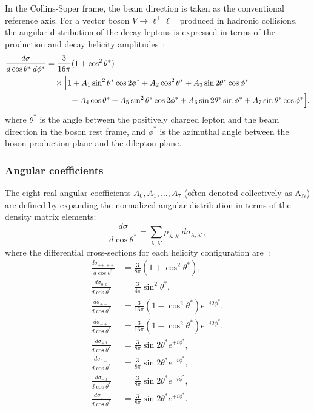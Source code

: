 \documentclass[11pt]{article}
\begin{document}
In the Collins-Soper frame, the beam direction is taken as the conventional reference axis. For a vector boson $V \to \ell^+\ell^-$ produced in hadronic collisions, the angular distribution of the decay leptons is expressed in terms of the production and decay helicity amplitudes~\cite{CMS:2015cyj,ATLAS:2016rnf,Mirkes:1994eb}:
\begin{align}
    \frac{d\sigma}{d\cos\theta^* \, d\phi^*}
    &= \frac{3}{16\pi} (1 + \cos^2\theta^*) \notag \\
    &\quad \times \Bigl[1
        + A_1 \sin^2\theta^* \cos 2\phi^*
        + A_2 \cos^2\theta^*
        + A_3 \sin 2\theta^* \cos\phi^* \notag \\
    &\qquad\quad + A_4 \cos\theta^*
        + A_5 \sin^2\theta^* \cos 2\phi^*
        + A_6 \sin 2\theta^* \sin\phi^*
        + A_7 \sin\theta^* \cos\phi^*\Bigr],
\end{align}
where $\theta^*$ is the angle between the positively charged lepton and the beam direction in the boson rest frame, and $\phi^*$ is the azimuthal angle between the boson production plane and the dilepton plane.

\subsubsection{Angular coefficients}

The eight real angular coefficients $A_0, A_1, \ldots, A_7$ (often denoted collectively as A$_N$) are defined by expanding the normalized angular distribution in terms of the density matrix elements:
\begin{equation}
    \frac{d\sigma}{d\cos\theta^*} = \sum_{\lambda,\lambda'} \rho_{\lambda,\lambda'} \, d\sigma_{\lambda,\lambda'},
\end{equation}
where the differential cross-sections for each helicity configuration are~\cite{Mirkes:1994eb}:
\begin{align}
    \frac{d\sigma_{++,++}}{d\cos\theta^*} &= \frac{3}{8\pi} (1 + \cos^2\theta^*), \\
    \frac{d\sigma_{0,0}}{d\cos\theta^*} &= \frac{3}{4\pi} \sin^2\theta^*, \\
    \frac{d\sigma_{+-}}{d\cos\theta^*} &= \frac{3}{16\pi} (1 - \cos^2\theta^*) e^{+i2\phi^*}, \\
    \frac{d\sigma_{-+}}{d\cos\theta^*} &= \frac{3}{16\pi} (1 - \cos^2\theta^*) e^{-i2\phi^*}, \\
    \frac{d\sigma_{+0}}{d\cos\theta^*} &= \frac{3}{8\pi} \sin 2\theta^* e^{+i\phi^*}, \\
    \frac{d\sigma_{0+}}{d\cos\theta^*} &= \frac{3}{8\pi} \sin 2\theta^* e^{-i\phi^*}, \\
    \frac{d\sigma_{-0}}{d\cos\theta^*} &= \frac{3}{8\pi} \sin 2\theta^* e^{-i\phi^*}, \\
    \frac{d\sigma_{0-}}{d\cos\theta^*} &= \frac{3}{8\pi} \sin 2\theta^* e^{+i\phi^*}.
\end{align}
\end{document}
